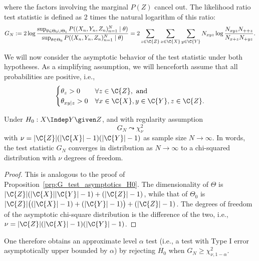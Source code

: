 where the factors involving the marginal $P(Z)$ cancel out.
The likelihood ratio test statistic is defined as 2 times the natural logarithm of this ratio:
\begin{equation}\label{eq:cond_G_test_statistic}
G_N := 2 \log \frac{\sup_{\theta\in\Theta_0\cup\Theta_1} P((X_n,Y_n,Z_n)_{n=1}^N \mid \theta)}{\sup_{\theta\in\Theta_0} P((X_n,Y_n,Z_n)_{n=1}^N \mid \theta)} = 2 \sum_{z\in\C{Z}} \sum_{x\in\C{X}} \sum_{y\in\C{Y}} N_{xyz} \log \frac{N_{xyz} N_{+ + z}}{N_{x+ z} N_{+ y z}}.
\end{equation}

We will now consider the asymptotic behavior of the test statistic under both hypotheses.
As a simplifying assumption, we will henceforth assume that all probabilities are positive, i.e.,
\begin{equation}\label{eq:cond_G_test_regularity}
  \begin{cases}
    \theta_z > 0 & \forall z \in \C{Z}, \text{ and}\\
    \theta_{xy|z} > 0 & \forall x \in \C{X}, y\in \C{Y}, z\in \C{Z}.
  \end{cases}
\end{equation}
\begin{Prp}\label{prp:cond_G_test_asymptotics_H0}
Under $H_0 : X \Indep Y \given Z$, and with regularity assumption 
$$G_N \leadsto \chi_\nu^2$$
with $\nu = |\C{Z}|(|\C{X}| - 1)(|\C{Y}| - 1)$ as sample size $N \to \infty$.
In words, the test statistic $G_N$ converges in distribution as $N \to \infty$ to a chi-squared distribution with $\nu$ degrees of freedom.
\end{Prp}
\begin{proof}
This is analogous to the proof of Proposition~\ref{prp:G_test_asymptotics_H0}.
The dimensionality of $\Theta$ is $|\C{Z}|(|\C{X}||\C{Y}| - 1) + (|\C{Z}|-1)$, while
that of $\Theta_0$ is $|\C{Z}|\big((|\C{X}|-1) + (|\C{Y}|-1)\big) + (|\C{Z}|-1)$. The degrees
of freedom of the asymptotic chi-square distribution is the difference of the two, i.e.,
$\nu = |\C{Z}|(|\C{X}| - 1)(|\C{Y}| - 1)$.
\end{proof}

One therefore obtains an approximate level $\alpha$ test (i.e., a test with Type I error asymptotically upper bounded by $\alpha$) 
by rejecting $H_0$ when $G_N \ge \chi_{\nu,1-\alpha}^2$.


